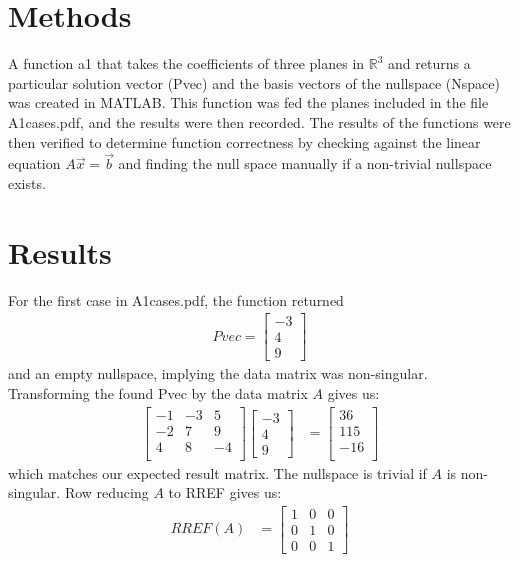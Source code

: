 \documentclass{article}
\begin{document}
	\section*{Methods}
	A function a1 that takes the coefficients of three planes in $\mathbb{R}^3$ and returns a particular solution vector (Pvec) and the basis vectors of the nullspace (Nspace) was created in MATLAB. This function was fed the planes included in the file A1cases.pdf, and the results were then recorded. The results of the functions were then verified to determine function correctness by checking against the linear equation $A\vec{x} = \vec{b}$ and finding the null space manually if a non-trivial nullspace exists.
	\section*{Results}
	For the first case in A1cases.pdf, the function returned
		\begin{align*}
			Pvec = \left[\begin{matrix}
							-3\\
							4\\
							9
						\end{matrix}\right]
		\end{align*}
	and an empty nullspace, implying the data matrix was non-singular. Transforming the found Pvec by the data matrix $A$ gives us:
		\begin{align*}
			\left[\begin{matrix}
					-1 & -3 & 5\\
					-2 & 7 & 9\\
					4 & 8 & -4\\
				   \end{matrix}\right]\left[\begin{matrix}
						-3\\
						4\\
						9
					\end{matrix}\right] &= \left[\begin{matrix}
						36\\
						115\\
						-16\\
					\end{matrix}\right]
		\end{align*}
	which matches our expected result matrix. The nullspace is trivial if $A$ is non-singular. Row reducing $A$ to RREF gives us:
		\begin{align*}
			RREF(A) &= \left[\begin{matrix}
				1 & 0 & 0\\
				0 & 1 & 0\\
				0 & 0 & 1
			\end{matrix}\right]
		\end{align*}
\end{document}
